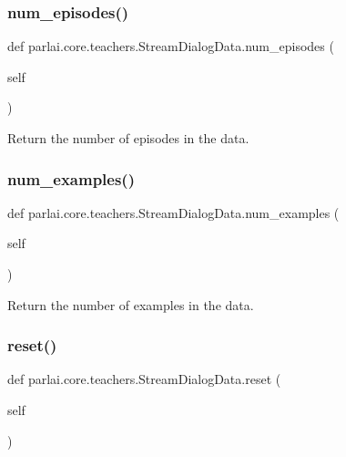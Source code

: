 \subsubsection{\texorpdfstring{num\+\_\+episodes()}{num\_episodes()}}
{\footnotesize\ttfamily def parlai.\+core.\+teachers.\+Stream\+Dialog\+Data.\+num\+\_\+episodes (\begin{DoxyParamCaption}\item[{}]{self }\end{DoxyParamCaption})}

\begin{DoxyVerb}Return the number of episodes in the data.
\end{DoxyVerb}
 \mbox{\label{classparlai_1_1core_1_1teachers_1_1StreamDialogData_ada385b7a8f549f4d65eb910b668c77e5}} 
\subsubsection{\texorpdfstring{num\+\_\+examples()}{num\_examples()}}
{\footnotesize\ttfamily def parlai.\+core.\+teachers.\+Stream\+Dialog\+Data.\+num\+\_\+examples (\begin{DoxyParamCaption}\item[{}]{self }\end{DoxyParamCaption})}

\begin{DoxyVerb}Return the number of examples in the data.
\end{DoxyVerb}
 \mbox{\label{classparlai_1_1core_1_1teachers_1_1StreamDialogData_a6375bd13d685da4b3449caaafcc5ec13}} 
\subsubsection{\texorpdfstring{reset()}{reset()}}
{\footnotesize\ttfamily def parlai.\+core.\+teachers.\+Stream\+Dialog\+Data.\+reset (\begin{DoxyParamCaption}\item[{}]{self }\end{DoxyParamCaption})}

